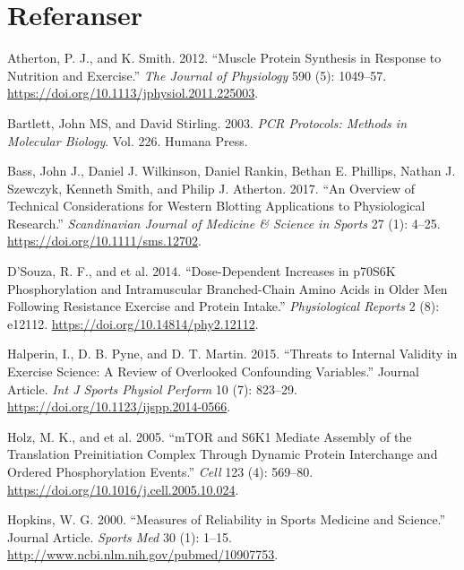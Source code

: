 \documentclass[
  letterpaper,
  DIV=11,
  numbers=noendperiod]{scrreprt}
\newlength{\cslhangindent}
\newenvironment{CSLReferences}[2] %
 {\begin{list}{}{%
  \setlength{\itemindent}{0pt}
  \setlength{\leftmargin}{0pt}
  \setlength{\parsep}{0pt}
  \ifodd #1
   \setlength{\leftmargin}{\cslhangindent}
   \setlength{\itemindent}{-1\cslhangindent}
  \fi
  \setlength{\itemsep}{#2\baselineskip}}}
 {\end{list}}
\begin{document}

\chapter*{Referanser}\label{referanser}

\label{refs}
\begin{CSLReferences}{1}{0}
Atherton, P. J., and K. Smith. 2012. {``Muscle Protein Synthesis in
Response to Nutrition and Exercise.''} \emph{The Journal of Physiology}
590 (5): 1049--57. \url{https://doi.org/10.1113/jphysiol.2011.225003}.

Bartlett, John MS, and David Stirling. 2003. \emph{PCR Protocols:
Methods in Molecular Biology}. Vol. 226. Humana Press.

Bass, John J., Daniel J. Wilkinson, Daniel Rankin, Bethan E. Phillips,
Nathan J. Szewczyk, Kenneth Smith, and Philip J. Atherton. 2017. {``An
Overview of Technical Considerations for Western Blotting Applications
to Physiological Research.''} \emph{Scandinavian Journal of Medicine \&
Science in Sports} 27 (1): 4--25.
\url{https://doi.org/10.1111/sms.12702}.

D'Souza, R. F., and et al. 2014. {``Dose-Dependent Increases in p70S6K
Phosphorylation and Intramuscular Branched-Chain Amino Acids in Older
Men Following Resistance Exercise and Protein Intake.''}
\emph{Physiological Reports} 2 (8): e12112.
\url{https://doi.org/10.14814/phy2.12112}.

Halperin, I., D. B. Pyne, and D. T. Martin. 2015. {``Threats to Internal
Validity in Exercise Science: A Review of Overlooked Confounding
Variables.''} Journal Article. \emph{Int J Sports Physiol Perform} 10
(7): 823--29. \url{https://doi.org/10.1123/ijspp.2014-0566}.

Holz, M. K., and et al. 2005. {``mTOR and S6K1 Mediate Assembly of the
Translation Preinitiation Complex Through Dynamic Protein Interchange
and Ordered Phosphorylation Events.''} \emph{Cell} 123 (4): 569--80.
\url{https://doi.org/10.1016/j.cell.2005.10.024}.

Hopkins, W. G. 2000. {``Measures of Reliability in Sports Medicine and
Science.''} Journal Article. \emph{Sports Med} 30 (1): 1--15.
\url{http://www.ncbi.nlm.nih.gov/pubmed/10907753}.


\end{CSLReferences}
\end{document}
